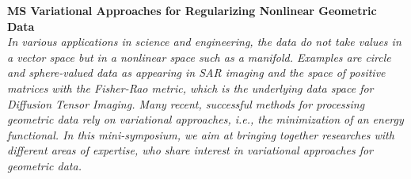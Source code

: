   \noindent\textbf{MS Variational Approaches for Regularizing Nonlinear Geometric Data}\\
  \textit{In various applications in science and engineering, the data do not take values in a vector space
but in a nonlinear space such as a manifold. Examples are circle and
sphere-valued data as appearing in SAR imaging and the space of positive
matrices with the Fisher-Rao metric, which is the underlying data space for
Diffusion Tensor Imaging. Many recent, successful methods for processing
geometric data rely on variational approaches, i.e., the minimization of an
energy functional. In this mini-symposium, we aim at bringing together
researches with different areas of expertise, who share interest in variational approaches for geometric data.} \\
    
